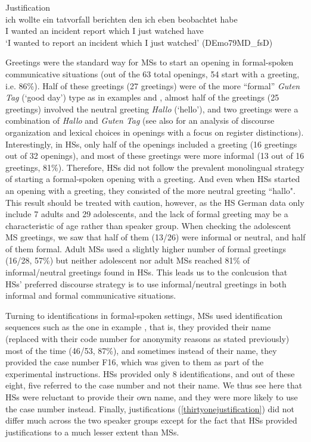 \documentclass[output=paper,colorlinks,citecolor=brown]{langscibook}
\begin{document}
\ea Justification\\ \label{thirtyonejustification}
\gll ich wollte ein tatvorfall berichten den   ich eben beobachtet habe\\
     I   wanted an  incident   report    which I   just watched    have\\
\glt `I wanted to report an incident which I just watched' (DEmo79MD\_fsD)
\z

Greetings were the standard way for MSs to start an opening in formal-spoken communicative situations (out of the 63 total openings, 54 start with a greeting, i.e. 86\%). Half of these greetings (27 greetings) were of the more “formal” \emph{Guten Tag} (‘good day’) type as in examples  and , almost half of the greetings (25 greetings) involved the neutral greeting \emph{Hallo} (‘hello’), and two greetings were a combination of \emph{Hallo} and \emph{Guten Tag} (see also \cite{chapters/02} for an analysis of discourse organization and lexical choices in openings with a focus on register distinctions). Interestingly, in HSs, only half of the openings included a greeting (16 greetings out of 32 openings), and most of these greetings were more informal (13 out of 16 greetings, 81\%). Therefore, HSs did not follow the prevalent monolingual strategy of starting a formal-spoken opening with a greeting. And even when HSs started an opening with a greeting, they consisted of the more neutral greeting ``hallo". This result should be treated with caution, however, as the HS German data only include 7 adults and 29 adolescents, and the lack of formal greeting may be a characteristic of age rather than speaker group. When checking the adolescent MS greetings, we saw that half of them (13/26) were informal or neutral, and half of them formal. 
Adult MSs used a slightly higher number of formal greetings (16/28, 57\%) but neither adolescent nor adult MSs reached 81\% of informal/neutral greetings found in HSs. This leads us to the conlcusion that HSs' preferred discourse strategy is to use informal\slash neutral greetings in both informal and formal communicative situations. 

Turning to identifications in formal-spoken settings, MSs used identification sequences such as the one in example , that is, they provided their name (replaced with their code number for anonymity reasons as stated previously) most of the time (46/53, 87\%), and sometimes instead of their name, they provided the case number F16, which was given to them as part of the experimental instructions. HSs provided only 8 identifications, and out of these eight, five referred to the case number and not their name. We thus see here that HSs were reluctant to provide their own name, and they were more likely to use the case number instead. Finally, justifications (\ref{thirtyonejustification}) did not differ much across the two speaker groups except for the fact that HSs provided justifications to a much lesser extent than MSs.  
\end{document}
